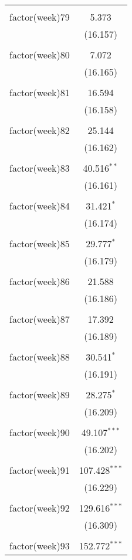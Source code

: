 \documentclass{article}
\begin{document}
\begin{table}[!htbp]
\begin{tabular}{@{\extracolsep{5pt}}lc}
  & \\ 
 factor(week)79 & 5.373 \\ 
  & (16.157) \\ 
  & \\ 
 factor(week)80 & 7.072 \\ 
  & (16.165) \\ 
  & \\ 
 factor(week)81 & 16.594 \\ 
  & (16.158) \\ 
  & \\ 
 factor(week)82 & 25.144 \\ 
  & (16.162) \\ 
  & \\ 
 factor(week)83 & 40.516$^{**}$ \\ 
  & (16.161) \\ 
  & \\ 
 factor(week)84 & 31.421$^{*}$ \\ 
  & (16.174) \\ 
  & \\ 
 factor(week)85 & 29.777$^{*}$ \\ 
  & (16.179) \\ 
  & \\ 
 factor(week)86 & 21.588 \\ 
  & (16.186) \\ 
  & \\ 
 factor(week)87 & 17.392 \\ 
  & (16.189) \\ 
  & \\ 
 factor(week)88 & 30.541$^{*}$ \\ 
  & (16.191) \\ 
  & \\ 
 factor(week)89 & 28.275$^{*}$ \\ 
  & (16.209) \\ 
  & \\ 
 factor(week)90 & 49.107$^{***}$ \\ 
  & (16.202) \\ 
  & \\ 
 factor(week)91 & 107.428$^{***}$ \\ 
  & (16.229) \\ 
  & \\ 
 factor(week)92 & 129.616$^{***}$ \\ 
  & (16.309) \\ 
  & \\ 
 factor(week)93 & 152.772$^{***}$ \\ 

\end{tabular}
\end{table}
\end{document}
